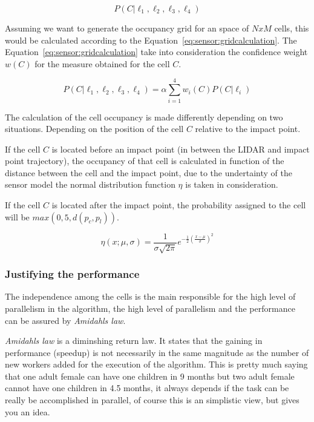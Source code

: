 \begin{equation}
\label{eq:sensor:lidarfusion}
P(C|\ell_1,\ell_2,\ell_3,\ell_4)
\end{equation}

Assuming we want to generate the occupancy grid for an space of $NxM$ cells, this would be calculated according to the Equation~\ref{eq:sensor:gridcalculation}. The Equation~\ref{eq:sensor:gridcalculation} take into consideration the confidence weight $w(C)$ for the measure obtained for the cell $C$.

\begin{equation}
\label{eq:sensor:gridcalculation}
P(C|\ell_1,\ell_2,\ell_3,\ell_4)=\alpha \sum_{i=1}^{4} w_i(C)P(C|\ell_i)
\end{equation}

The calculation of the cell occupancy is made differently depending on two situations. Depending on the position of the cell $C$ relative to the impact point.

If the cell $C$ is located before an impact point (in between the LIDAR and impact point trajectory), the occupancy of that cell is calculated in function of the distance between the cell and the impact point, due to the undertainty of the sensor model the normal distribution function $\eta$ is taken in consideration.

If the cell $C$ is located after the impact point, the probability assigned to the cell will be $max(0,5,d(p_c,p_l))$.

\begin{equation}
\label{eq:sensor:normal}
\eta(x;\mu,\sigma)=\frac{1}{\sigma \sqrt{2\pi}}e^{-\frac{1}{2}(\frac{x-\mu}{\sigma})^2} 
\end{equation}

\subsubsection{Justifying the performance}

The independence among the cells is the main responsible for the high level of parallelism in the algorithm, the high level of parallelism and the performance can be assured by \textit{Amidahls law}.

\textit{Amidahls law} is a diminshing return law. It states that the gaining in performance (speedup) is not necessarily in the same magnitude as the number of new workers added for the execution of the algorithm\cite{Amdahl:1967:VSP:1465482.1465560}. This is pretty much saying that one adult female can have one children in 9 months but two adult female cannot have one children in 4.5 months, it always depends if the task can be really be accomplished in parallel, of course this is an simplistic view, but gives you an idea.

